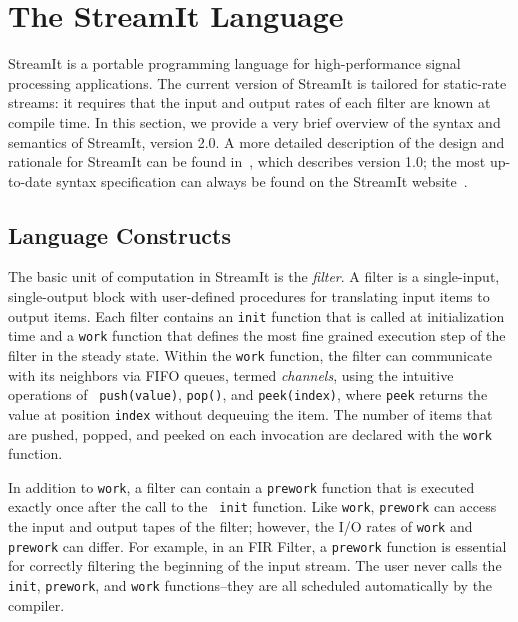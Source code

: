 \section{The StreamIt Language}
\label{sec:streamit}

StreamIt is a portable programming language for high-performance
signal processing applications.  The current version of StreamIt is
tailored for static-rate streams: it requires that the input and
output rates of each filter are known at compile time.  In this
section, we provide a very brief overview of the syntax and semantics
of StreamIt, version 2.0.  A more detailed description of the design
and rationale for StreamIt can be found in~\cite{streamitcc}, which
describes version 1.0; the most up-to-date syntax specification can
always be found on the StreamIt website~\cite{streamitweb}.

\subsection{Language Constructs}

The basic unit of computation in StreamIt is the {\it filter}.  A
filter is a single-input, single-output block with user-defined
procedures for translating input items to output items.  Each filter
contains an {\tt init} function that is called at initialization time
and a {\tt work} function that defines the most fine grained execution
step of the filter in the steady state.  Within the {\tt work}
function, the filter can communicate with its neighbors via FIFO
queues, termed {\it channels}, using the intuitive operations of {\tt
push(value)}, {\tt pop()}, and {\tt peek(index)}, where {\tt peek}
returns the value at position {\tt index} without dequeuing the item.
The number of items that are pushed, popped, and peeked on each
invocation are declared with the {\tt work} function.

In addition to {\tt work}, a filter can contain a {\tt prework}
function that is executed exactly once after the call to the {\tt
init} function.  Like {\tt work}, {\tt prework} can access the input and
output tapes of the filter; however, the I/O rates of {\tt work} and
{\tt prework} can differ.  For example, in an FIR Filter, a {\tt prework}
function is essential for correctly filtering the beginning of the
input stream.  The user never calls the {\tt init}, {\tt prework}, and
{\tt work} functions--they are all scheduled automatically by the compiler.

